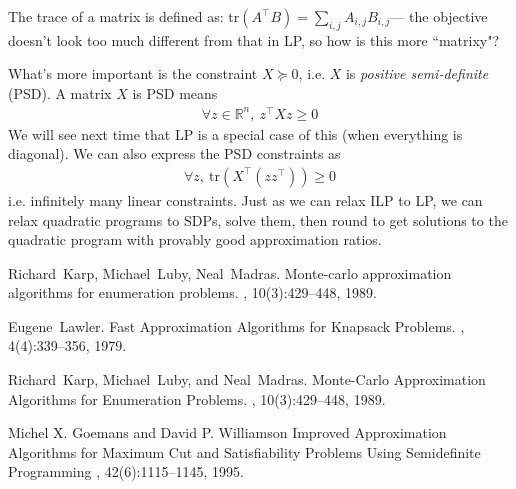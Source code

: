 \documentclass[11pt]{article}
\newcommand{\tr}{\mathrm{tr}}
\theoremstyle{definition}
\theoremstyle{remark}
\begin{document}
The trace of a matrix is defined as:  $\tr(A^\intercal B) = \sum_{i,j}A_{i,j} B_{i,j}$--- the objective doesn't look too much different from that in LP, so how is this more ``matrixy"? 

What's more important is the constraint $X \succeq 0$, i.e. $X$ is \emph{positive semi-definite} (PSD). A matrix $X$ is PSD means
\begin{align*}
	\forall z \in \mathbb{R}^n, ~z^\intercal X z \geq 0
\end{align*}
We will see next time that LP is a special case of this (when everything is diagonal). We can also express the PSD constraints as
\begin{align*}
	\forall z,~\tr(X^\intercal (zz^\intercal)) \geq 0
\end{align*}
i.e. infinitely many linear constraints. Just as we can relax ILP to LP, we can relax quadratic programs to SDPs, solve them, then round to get solutions to the quadratic program with provably good approximation ratios.


  

\begin{thebibliography}{42}


    Richard~Karp, Michael~Luby, Neal~Madras.
\newblock Monte-carlo approximation algorithms for enumeration problems.
, 10(3):429--448, 1989.


Eugene~Lawler.
\newblock Fast Approximation Algorithms for Knapsack Problems.
, 4(4):339--356, 1979.


Richard~Karp, Michael~Luby, and Neal~Madras.
\newblock Monte-Carlo Approximation Algorithms for Enumeration Problems.
, 10(3):429--448, 1989.


Michel X. Goemans and David P. Williamson
\newblock Improved Approximation Algorithms for Maximum Cut and Satisfiability Problems Using Semidefinite Programming
, 42(6):1115--1145, 1995.

\end{thebibliography}
\end{document}
